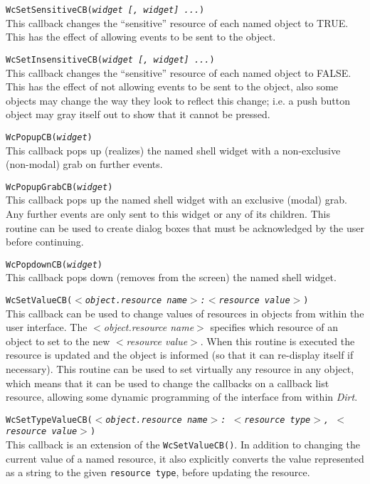 \begin{description}
\item{\tt WcSetSensitiveCB({\em widget [, widget] ...})} \\
This callback changes the ``sensitive'' resource of each named object to
TRUE.  This has the effect of allowing events to be sent to the object.

\item{\tt WcSetInsensitiveCB({\em widget [, widget] ...})} \\
This callback changes the ``sensitive'' resource of each named object to
FALSE.  This has the effect of not allowing events to be sent to the object,
also some objects may change the way they look to reflect this change; {i.e.}
a push button object may gray itself out to show that it cannot be pressed.

\item{\tt WcPopupCB({\em widget})} \\
This callback pops up (realizes) the named shell widget with a
non-exclusive (non-modal) grab on further events.

\item{\tt WcPopupGrabCB({\em widget})} \\
This callback pops up the named shell widget with an exclusive (modal)
grab.  Any further events are only sent to this widget or any of its
children.  This routine can be used to create dialog boxes that must be
acknowledged by the user before continuing.

\item{\tt WcPopdownCB({\em widget})} \\
This callback pops down (removes from the screen) the named shell widget.

\item{\tt WcSetValueCB({\em $<$object.resource name$>$:$<$resource value$>$})} \\
This callback can be used to change values of resources in objects from
within the user interface.  The {\em $<$object.resource name$>$} specifies which
resource of an object to set to the new {\em $<$resource value$>$}.  When this
routine is executed the resource is updated and the object is informed (so
that it can re-display itself if necessary).  This routine can be used to
set virtually any resource in any object, which means that it can be used to
change the callbacks on a callback list resource, allowing some dynamic
programming of the interface from within {\em Dirt}.

\item{\tt WcSetTypeValueCB({\em $<$object.resource name$>$: $<$resource
type$>$, $<$resource value$>$})} \\
This callback is an extension of the {\tt WcSetValueCB()}. In addition to
changing the current value of a named resource, it also explicitly
converts the value represented as a string to the given {\tt resource
type}, before updating the resource.


\end{description}

